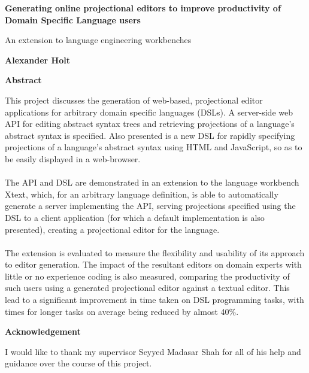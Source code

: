 \documentclass{article}
\begin{document}
\clearpage
%
\thispagestyle{plain}
\begin{center}
    \Large
    \textbf{Generating online projectional editors to improve productivity of Domain Specific Language users}
    
    \vspace{0.4cm}
    \large
    An extension to language engineering workbenches
    
    \vspace{0.4cm}
    \textbf{Alexander Holt}
    
    \vspace{0.9cm}
    \textbf{Abstract}
\end{center}
This project discusses the generation of web-based, projectional editor applications for arbitrary domain specific languages (DSLs). A server-side web API for editing abstract syntax trees and retrieving projections of a language's abstract syntax is specified. Also presented is a new DSL for rapidly specifying projections of a language's abstract syntax using HTML and JavaScript, so as to be easily displayed in a web-browser. 
\\
\\
The API and DSL are demonstrated in an extension to the language workbench Xtext, which, for an arbitrary language definition, is able to automatically generate a server implementing the API, serving projections specified using the DSL to a client application (for which a default implementation is also presented), creating a projectional editor for the language.
\\
\\
The extension is evaluated to measure the flexibility and usability of its approach to editor generation. The impact of the resultant editors on domain experts with little or no experience coding is also measured, comparing the productivity of such users using a generated projectional editor against a textual editor. This lead to a significant improvement in time taken on DSL programming tasks, with times for longer tasks on average being reduced by almost 40\%.
\begin{center}
	\vspace {1.5cm}
    \Large
    \textbf{Acknowledgement}
\end{center}
I would like to thank my supervisor Seyyed Madasar Shah for all of his help and guidance over the course of this project.
\end{document}
